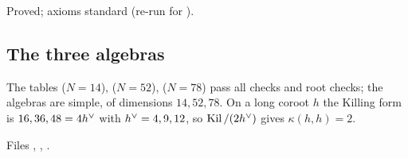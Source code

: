 \begin{status}
Proved; axioms standard (re-run for ).
\end{status}

\subsection{The three algebras}

\begin{theorem}\label{l23:thm:g2f4e6}
The tables  ($N=14$),  ($N=52$),  ($N=78$) pass all checks and root checks; the algebras are simple, of
dimensions $14,52,78$. On a long coroot $h$ the Killing form is $16,36,48=4h^\vee$ with $h^\vee=4,9,12$, so $\operatorname{Kil}/(2h^\vee)$ gives
$\kappa(h,h)=2$.
\end{theorem}
\noindent Files ,
, .
